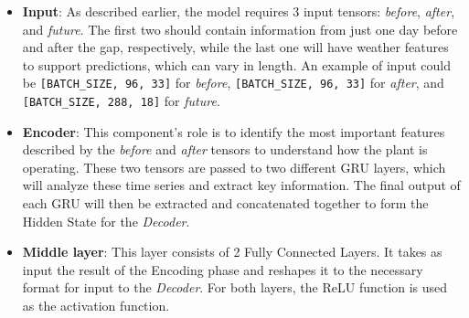 \begin{itemize}
	\item \textbf{Input}: As described earlier, the model requires 3 input tensors: \textit{before}, \textit{after}, and \textit{future}. The first two should contain information from just one day before and after the gap, respectively, while the last one will have weather features to support predictions, which can vary in length. An example of input could be \verb|[BATCH_SIZE, 96, 33]| for \textit{before}, \verb|[BATCH_SIZE, 96, 33]| for \textit{after}, and \verb|[BATCH_SIZE, 288, 18]| for \textit{future}.

	\item \textbf{Encoder}: This component's role is to identify the most important features described by the \textit{before} and \textit{after} tensors to understand how the plant is operating. These two tensors are passed to two different GRU\cite{gru2} layers, which will analyze these time series and extract key information. The final output of each GRU will then be extracted and concatenated together to form the Hidden State for the \textit{Decoder}.

	\item \textbf{Middle layer}: This layer consists of 2 Fully Connected Layers. It takes as input the result of the Encoding phase and reshapes it to the necessary format for input to the \textit{Decoder}. For both layers, the ReLU\cite{functions} function is used as the activation function.


\end{itemize}
